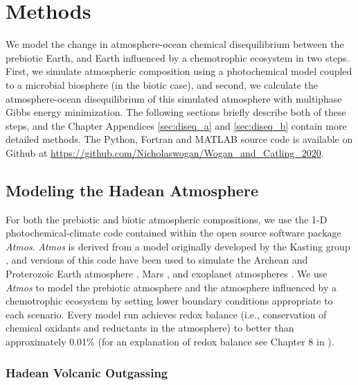 \section{Methods}

We model the change in atmosphere-ocean chemical disequilibrium between the prebiotic Earth, and Earth influenced by a chemotrophic ecosystem in two steps. First, we simulate atmospheric composition using a photochemical model coupled to a microbial biosphere (in the biotic case), and second, we calculate the atmosphere-ocean disequilibrium of this simulated atmosphere with multiphase Gibbs energy minimization. The following sections briefly describe both of these steps, and the Chapter Appendices \ref{sec:diseq_a} and \ref{sec:diseq_b} contain more detailed methods. The Python, Fortran and MATLAB source code is available on Github at \url{https://github.com/Nicholaswogan/Wogan_and_Catling_2020}.

\subsection{Modeling the Hadean Atmosphere}

For both the prebiotic and biotic atmospheric compositions, we use the 1-D photochemical-climate code contained within the open source software package \textit{Atmos}. \textit{Atmos} is derived from a model originally developed by the Kasting group \citep{Pavlov_2001}, and versions of this code have been used to simulate the Archean and Proterozoic Earth atmosphere \citep{Zahnle_2006}, Mars \citep{Sholes_2019,Smith_2014,Zahnle_2008}, and exoplanet atmospheres \citep{Arney_2016,Schwieterman_2019}. We use \textit{Atmos} to model the prebiotic atmosphere and the atmosphere influenced by a chemotrophic ecosystem by setting lower boundary conditions appropriate to each scenario. Every model run achieves redox balance (i.e., conservation of chemical oxidants and reductants in the atmosphere) to better than approximately 0.01\% (for an explanation of redox balance see Chapter 8 in \citet{Catling_2017}).

\subsubsection{Hadean Volcanic Outgassing}

